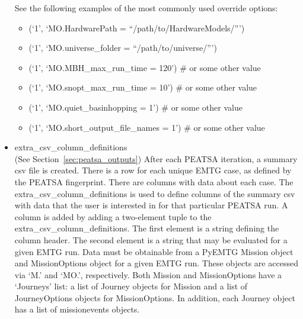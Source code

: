 \begin{itemize}
	See the following examples of the most commonly used override options:
	\begin{itemize}
		\item (`1', `MO.HardwarePath = ``/path/to/HardwareModels/''')
		\item (`1', `MO.universe\_folder = ``/path/to/universe/''')
		\item (`1', `MO.MBH\_max\_run\_time = 120') \# or some other value
		\item (`1', `MO.snopt\_max\_run\_time = 10') \# or some other value
		\item (`1', `MO.quiet\_basinhopping = 1') \# or some other value
		\item (`1', `MO.short\_output\_file\_names = 1') \# or some other value
	\end{itemize}
	\item extra\_csv\_column\_definitions \\ (See Section~\ref{sec:peatsa_outputs}) After each \ac{PEATSA} iteration, a summary csv file is created. There is a row for each unique \ac{EMTG} case, as defined by the \ac{PEATSA} fingerprint. There are columns with data about each case. The extra\_csv\_column\_definitions is used to define columns of the summary csv with data that the user is interested in for that particular \ac{PEATSA} run. A column is added by adding a two-element tuple to the extra\_csv\_column\_definitions. The first element is a string defining the column header. The second element is a string that may be evaluated for a given \ac{EMTG} run. Data must be obtainable from a PyEMTG Mission object and MissionOptions object for a given \ac{EMTG} run. These objects are accessed via `M.' and `MO.', respectively. Both Mission and MissionOptions have a `Journeys' list: a list of Journey objects for Mission and a list of JourneyOptions objects for MissionOptions. In addition, each Journey object has a list of missionevents objects. 
	

\end{itemize}
